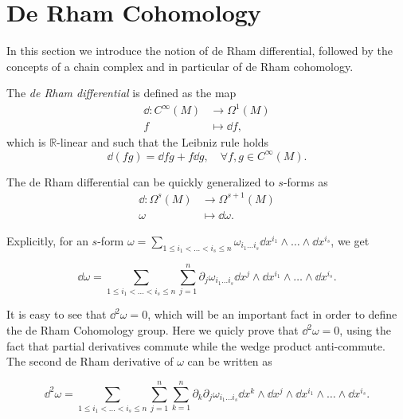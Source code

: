 \section{De Rham Cohomology}
\label{sec:derham}

In this section we introduce the notion of de Rham differential, followed by the concepts of a chain complex and in particular of de Rham cohomology.

\begin{definition}
    The \emph{de Rham differential} is defined as the map
    \begin{align*}
        \dd : C^{\infty}(M) &\rightarrow \Omega^1(M) \\
        f &\mapsto \dd f ,
    \end{align*}
    which is $\mathbb{R}$-linear and such that the Leibniz rule holds
    \begin{equation*}
        \dd (fg) = \dd fg + f \dd g, \quad \forall f, g \in C^{\infty}(M).
    \end{equation*}
\end{definition}

The de Rham differential can be quickly generalized to $s$-forms as
\begin{align*}
    \dd : \Omega^s (M) &\rightarrow \Omega^{s+1}(M) \\
    \omega &\mapsto \dd \omega .
\end{align*}

Explicitly, for an $s$-form $\omega = \sum_{1 \leq i_1 < \ldots < i_s \leq n} \omega_{i_1 \ldots i_s} \dd x^{i_1} \wedge \ldots \wedge \dd x^{i_s}$, we get

\begin{equation*}
    \dd \omega = \sum_{1 \leq i_1 < \ldots < i_s \leq n} \sum_{j = 1}^n \partial_j \omega_{i_1 \ldots i_s} \dd x^j \wedge \dd x^{i_1} \wedge \ldots \wedge \dd x^{i_s} .
\end{equation*}

It is easy to see that $\dd ^2 \omega = 0$, which will be an important fact in order to define the de Rham Cohomology group.
Here we quicly prove that $\dd^2 \omega = 0$, using the fact that partial derivatives commute while the wedge product anti-commute.
The second de Rham derivative of $\omega$ can be written as

\begin{equation*}
    \dd ^2 \omega =
    \sum_{1 \leq i_1 < \ldots < i_s \leq n} \sum_{j = 1}^n \sum_{k = 1}^n
    \partial_k \partial_j \omega_{i_1 \ldots i_s}
    \dd x^k \wedge \dd x^j \wedge \dd x^{i_1} \wedge \ldots \wedge \dd x^{i_s}.
\end{equation*}

